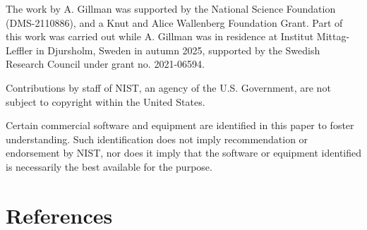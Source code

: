 \documentclass[
  12pt,
]{article}
\begin{document}
The work by A. Gillman was supported by the National Science Foundation
(DMS-2110886), and a Knut and Alice Wallenberg Foundation Grant. Part of
this work was carried out while A. Gillman was in residence at Institut
Mittag-Leffler in Djursholm, Sweden in autumn 2025, supported by the
Swedish Research Council under grant no. 2021-06594.

Contributions by staff of NIST, an agency of the U.S. Government, are
not subject to copyright within the United States.

Certain commercial software and equipment are identified in this paper
to foster understanding. Such identification does not imply
recommendation or endorsement by NIST, nor does it imply that the
software or equipment identified is necessarily the best available for
the purpose.

\section*{References}\label{references}
\end{document}

